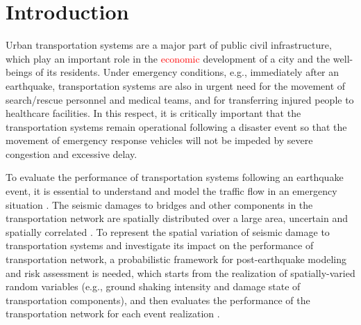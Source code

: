 \documentclass[review,11pt,nonatbib]{elsarticle}
\begin{document}
\section{Introduction}
Urban transportation systems are a major part of public civil infrastructure, which play an important role in the \textcolor{red}{economic} development of a city and the well-beings of its residents. Under emergency conditions, e.g., immediately after an earthquake, transportation systems are also in urgent need for the movement of search/rescue personnel and medical teams, and for transferring injured people to healthcare facilities. In this respect, it is critically important that the transportation systems remain operational following a disaster event so that the movement of emergency response vehicles will not be impeded by severe congestion and excessive delay.
\par To evaluate the performance of transportation systems following an earthquake event, it is essential to understand and model the traffic flow in an emergency situation \citep{brodsky1990emergency,jacques2014resilience,miller2016coupling}. The seismic damages to bridges and other components in the transportation network are spatially distributed over a large area, uncertain and spatially correlated \citep{Han2012Probabilistic}. To represent the spatial variation of seismic damage to transportation systems and investigate its impact on the performance of transportation network, a probabilistic framework for post-earthquake modeling and risk assessment is needed, which starts from the realization of spatially-varied random variables (e.g., ground shaking intensity and damage state of transportation components), and then evaluates the performance of the transportation network for each event realization \citep{Grossi2005Catastrophe,Han2012Probabilistic,Miller2015Estimating}. 
\end{document}
